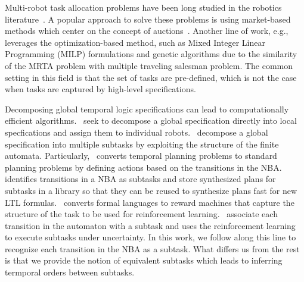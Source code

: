 \documentclass[Afour,sageh,times]{sagej}
\begin{document}
Multi-robot task allocation  problems  have been long studied in the robotics literature~\citep{korsah2013comprehensive,nunes2017taxonomy,gini2017multi}. A popular approach to solve these problems is using market-based methods which center on the concept of auctions~\cite{zavlanos2007distributed,zavlanos2008distributed,zavlanos2008dynamic,michael2008distributed}. Another line of work, e.g.,~\cite{gombolay2013fast,jones2011time} leverages the optimization-based method, such as Mixed Integer Linear Programming (MILP) formulations and genetic algorithms  due to the similarity of the MRTA problem with multiple traveling salesman problem. The common setting in this field is that the set of tasks are pre-defined, which is not the case when tasks are captured by high-level specifications.

Decomposing global temporal logic specifications can lead to computationally efficient algorithms.~\cite{tumova2015decomposition,kantaros2016distributed} seek to decompose a global specification directly into local specfications and assign them to individual robots.~\cite{camacho2017non,xluo_CDC19,camacho2019ltl,schillinger2019hierarchical} decompose a global specification into multiple subtasks by exploiting the structure of the finite automata. Particularly,~\cite{camacho2017non} converts temporal planning problems to standard planning problems by defining actions based on the transitions in the NBA.~\cite{xluo_CDC19} identifies transitions in a NBA as subtasks and store synthesized plans for subtasks in a library so that they can be reused to synthesize plans fast for new LTL formulas.~\cite{camacho2019ltl} converts formal languages to reward machines that capture the structure of the task to be used for reinforcement learning.~\cite{schillinger2019hierarchical} associate each transition in the automaton with a subtask and uses the reinforcement learning to execute subtasks under uncertainty. In this work, we follow along this line to recognize each transition in the NBA as a subtask. What differs us from the rest is that we provide the notion of equivalent subtasks which leads to inferring termporal orders between subtasks.
\end{document}

